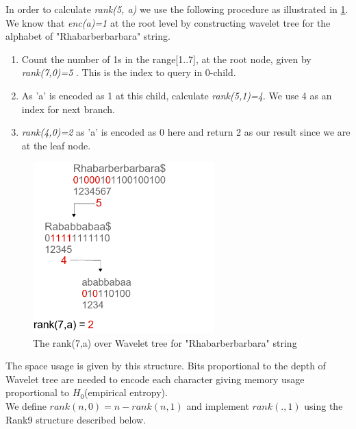 \documentclass[11pt,a4paper]{report}
\begin{document}
In order to calculate \emph{rank(5, a)} we use the following procedure
as illustrated in \ref{rank1}.\\
We know that \emph{enc(a)=1} at the root level by constructing wavelet
tree for the alphabet of  "Rhabarberbarbara" string.

\begin{enumerate}

    \item
		 Count the number of 1s in the range[1..7], at the root node, 
		 given by \emph{rank(7,0)=5 }. This is the index to query in 0-child.
		 
    \item
		As 'a' is encoded as 1 at this child, calculate \emph{rank(5,1)=4}. 
		We use 4 as an index for next branch.

    \item
		\emph{rank(4,0)=2} as 'a' is encoded as 0 here and return 2 as our
		 result since we are at the leaf node.

\end{enumerate}

\begin{figure}[H]
\centering
\includegraphics[width=7cm]{pictures/rank1.png}
\caption{The rank(7,a) over Wavelet tree for "Rhabarberbarbara" string }
\label{rank1}
\end{figure}

The space usage is given by this structure.
Bits proportional to the depth of  Wavelet tree are needed to encode
each character giving memory usage proportional to $H_{0}$(empirical entropy)\cite{entropy}.\\

We define \emph{$rank(n,0)= n- rank(n,1)$} and implement \emph{$rank(. , 1)$}
using the Rank9 structure described below.



\end{document}
